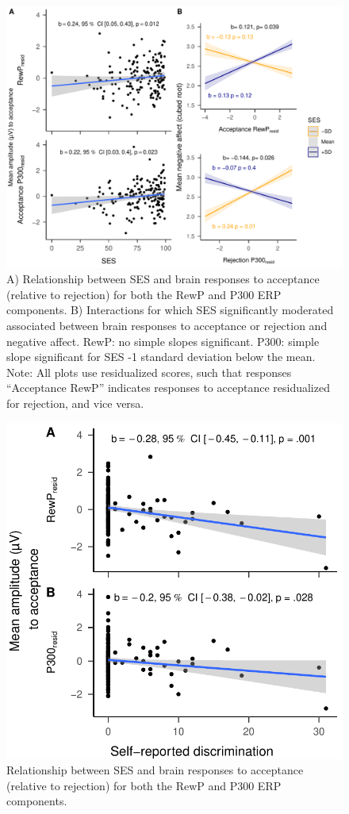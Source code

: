 \documentclass[
  man,floatsintext]{apa7}
\begin{document}
\begin{figure}
\centering
\includegraphics{BUDS_tables_and_figures_working_files/figure-latex/unnamed-chunk-14-1.pdf}
\caption{\label{fig:unnamed-chunk-14}A) Relationship between SES and brain responses to acceptance (relative to rejection) for both the RewP and P300 ERP components. B) Interactions for which SES significantly moderated associated between brain responses to acceptance or rejection and negative affect. RewP: no simple slopes significant. P300: simple slope significant for SES -1 standard deviation below the mean. Note: All plots use residualized scores, such that responses ``Acceptance RewP'' indicates responses to acceptance residualized for rejection, and vice versa.}
\end{figure}

\begin{figure}
\centering
\includegraphics{BUDS_tables_and_figures_working_files/figure-latex/unnamed-chunk-18-1.pdf}
\caption{\label{fig:unnamed-chunk-18}Relationship between SES and brain responses to acceptance (relative to rejection) for both the RewP and P300 ERP components.}
\end{figure}
\end{document}
